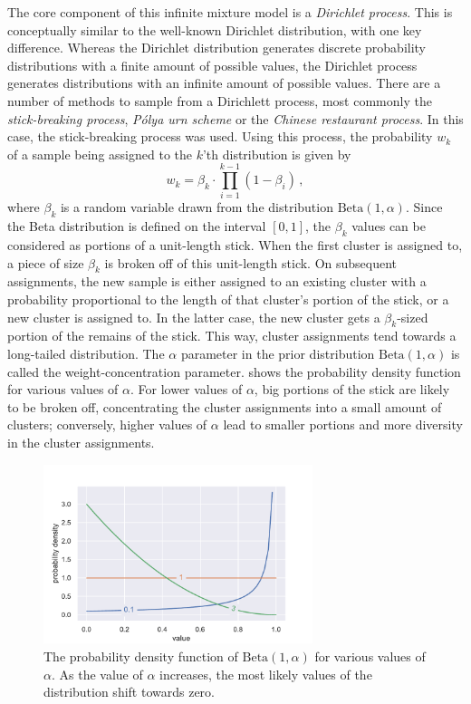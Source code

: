 The core component of this infinite mixture model is a \emph{Dirichlet
process}. This is conceptually similar to the well-known Dirichlet
distribution, with one key difference. Whereas the Dirichlet distribution
generates discrete probability distributions with a finite amount of possible
values, the Dirichlet process generates distributions with an infinite amount
of possible values. There are a number of methods to sample from a Dirichlett
process, most commonly the \emph{stick-breaking process}, \emph{P\'{o}lya urn
scheme} or the \emph{Chinese restaurant process}\citep{dirichlet}. In this
case, the stick-breaking process was used. Using this process, the probability
$w_k$ of a sample being assigned to the $k$'th distribution is given by
\begin{equation}
  w_k = \beta_k \cdot \prod_{i=1}^{k-1} (1 - \beta_i)\,,
\end{equation}
where $\beta_k$ is a random variable drawn from the distribution
$\mathrm{Beta}(1, \alpha)$. Since the Beta distribution is defined on the
interval $\left[0, 1\right]$, the $\beta_k$ values can be considered as
portions of a unit-length stick. When the first cluster is assigned to, a
piece of size $\beta_k$ is broken off of this unit-length stick. On subsequent
assignments, the new sample is either assigned to an existing cluster with a
probability proportional to the length of that cluster's portion of the stick,
or a new cluster is assigned to. In the latter case, the new cluster gets a
$\beta_k$-sized portion of the remains of the stick. This way, cluster
assignments tend towards a long-tailed distribution. The $\alpha$ parameter in
the prior distribution $\mathrm{Beta}(1, \alpha)$ is called the
weight-concentration parameter.  shows the probability
density function for various values of $\alpha$.
For lower values of $\alpha$, big portions of the stick are likely to be
broken off, concentrating the cluster assignments into a small amount of clusters;
conversely, higher values of $\alpha$ lead to smaller portions and more
diversity in the cluster assignments.

\begin{figure}[tb]
  \centering
  \includegraphics[width=0.7\textwidth]{figures/alpha.pdf}
  \caption{The probability density function of $\mathrm{Beta}(1, \alpha)$ for various
    values of $\alpha$. As the value of $\alpha$ increases, the most
    likely values of the distribution shift towards zero.\label{fig:alpha}}
\end{figure}

